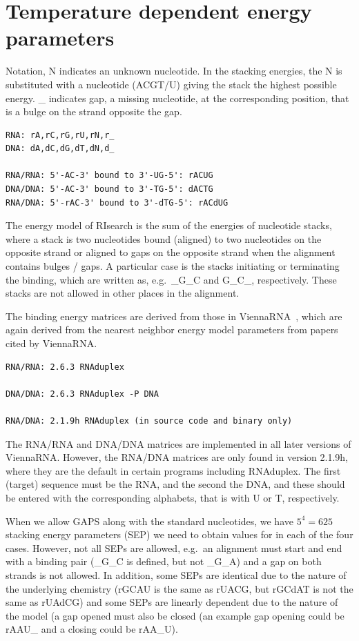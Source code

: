 \documentclass[11pt]{article}
\begin{document}
\section{Temperature dependent energy parameters}\label{sec:energy-params}
Notation, N indicates an unknown nucleotide.
In the stacking energies, the N is substituted with a nucleotide (ACGT/U) giving the stack the highest possible energy. \_ indicates gap, a missing nucleotide, at the corresponding position, that is a bulge on the strand opposite the gap.
\begin{verbatim}
RNA: rA,rC,rG,rU,rN,r_
DNA: dA,dC,dG,dT,dN,d_

RNA/RNA: 5'-AC-3' bound to 3'-UG-5': rACUG
DNA/DNA: 5'-AC-3' bound to 3'-TG-5': dACTG
RNA/DNA: 5'-rAC-3' bound to 3'-dTG-5': rACdUG
\end{verbatim}

The energy model of RIsearch is the sum of the energies of nucleotide stacks, where a stack is two nucleotides bound (aligned) to two nucleotides on the opposite strand or aligned to gaps on the opposite strand when the alignment contains bulges / gaps.
A particular case is the stacks initiating or terminating the binding, which are written as, e.g.\ \_G\_C and G\_C\_, respectively.
These stacks are not allowed in other places in the alignment.

The binding energy matrices are derived from those in ViennaRNA~\citep{lorenz2011vienna}, which are again derived from the nearest neighbor energy model parameters from papers~\citep{walter1994coaxial,turner1988rna,peritz1991thermodynamic,jaeger1989improved,he1991gu,turner2010nndb,mathews1999expanded,mathews2004incorporating} cited by ViennaRNA.
\begin{verbatim}
RNA/RNA: 2.6.3 RNAduplex

DNA/DNA: 2.6.3 RNAduplex -P DNA

RNA/DNA: 2.1.9h RNAduplex (in source code and binary only)
\end{verbatim}

The RNA/RNA and DNA/DNA matrices are implemented in all later versions of ViennaRNA.
However, the RNA/DNA matrices are only found in version 2.1.9h, where they are the default in certain programs including RNAduplex.
The first (target) sequence must be the RNA, and the second the DNA, and these should be entered with the corresponding alphabets, that is with U or T, respectively.

When we allow GAPS along with the standard nucleotides, we have $5^4 = 625$ stacking energy parameters (SEP) we need to obtain values for in each of the four cases.
However, not all SEPs are allowed, e.g.\ an alignment must start and end with a binding pair (\_G\_C is defined, but not \_G\_A) and a gap on both strands is not allowed.
In addition, some SEPs are identical due to the nature of the underlying chemistry (rGCAU is the same as rUACG, but rGCdAT is not the same as rUAdCG) and some SEPs are linearly dependent due to the nature of the model (a gap opened must also be closed (an example gap opening could be rAAU\_ and a closing could be rAA\_U).
\end{document}
